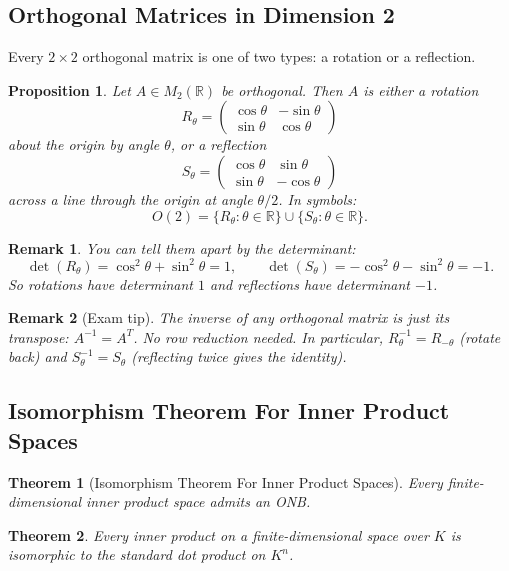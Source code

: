 \documentclass{article}
\newtheorem{theorem}{Theorem}
\newtheorem{remark}{Remark}
\newtheorem{proposition}{Proposition}
\begin{document}
\subsection{Orthogonal Matrices in Dimension 2}

Every $2\times 2$ orthogonal matrix is one of two types: a rotation or a reflection.

\begin{proposition}
    Let $A \in M_2(\mathbb{R})$ be orthogonal. Then $A$ is either a rotation
    \[R_\theta = \begin{pmatrix}\cos\theta & -\sin\theta \\ \sin\theta & \cos\theta\end{pmatrix}\]
    about the origin by angle $\theta$, or a reflection
    \[S_\theta = \begin{pmatrix}\cos\theta & \sin\theta \\ \sin\theta & -\cos\theta\end{pmatrix}\]
    across a line through the origin at angle $\theta/2$. In symbols:
    \[O(2) = \{R_\theta : \theta\in\mathbb{R}\} \cup \{S_\theta : \theta\in\mathbb{R}\}.\]
\end{proposition}

\begin{remark}
    You can tell them apart by the determinant:
    \[\det(R_\theta) = \cos^2\theta + \sin^2\theta = 1, \qquad \det(S_\theta) = -\cos^2\theta - \sin^2\theta = -1.\]
    So rotations have determinant $1$ and reflections have determinant $-1$.
\end{remark}

\begin{remark}[Exam tip]
    The inverse of any orthogonal matrix is just its transpose: $A^{-1} = A^T$. No row reduction needed. In particular, $R_\theta^{-1} = R_{-\theta}$ (rotate back) and $S_\theta^{-1} = S_\theta$ (reflecting twice gives the identity).
\end{remark}

\subsection{Isomorphism Theorem For Inner Product Spaces}
\begin{theorem}[Isomorphism Theorem For Inner Product Spaces]
    Every finite-dimensional inner product space admits an ONB.
\end{theorem}
\begin{theorem}
    Every inner product on a finite-dimensional space over $K$ is isomorphic to the standard dot product on $K^n$.
\end{theorem}
\end{document}
